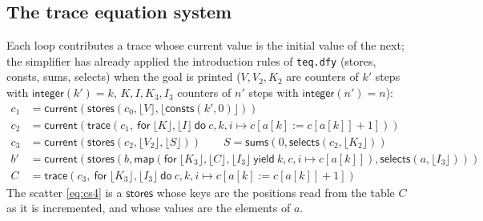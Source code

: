 \documentclass[11pt,a4paper]{article}
\newcommand{\bl}[1]{\lfloor #1\rfloor}                       %
\newcommand{\tr}[3]{\mathsf{trace}(#1,\ \mathsf{for}\ #2\ \mathsf{do}\ #3)}
\newcommand{\mapc}[2]{\mathsf{map}(\mathsf{for}\ #1\ \mathsf{yield}\ #2)}
\newcommand{\cur}{\mathsf{current}}
\newcommand{\intf}{\mathsf{integer}}
\newcommand{\sums}{\mathsf{sums}}
\begin{document}
\subsection{The trace equation system}
Each loop contributes a trace whose current value is the initial value of the next; the simplifier has
already applied the introduction rules of \texttt{teq.dfy} (stores, consts, sums, selects) when the goal
is printed ($V, V_2, K_2$ are counters of $k'$ steps with $\intf(k') = k$, $K, I, K_3, I_3$ counters of
$n'$ steps with $\intf(n') = n$):
\begin{align}
  c_1 &= \cur(\mathsf{stores}(c_0, \bl{V}, \bl{\mathsf{consts}(k', 0)})) \label{eq:cs1}\\
  c_2 &= \cur(\tr{c_1}{\bl{K}, \bl{I}}{c, k, i \mapsto c[a[k] := c[a[k]] + 1]}) \label{eq:cs2}\\
  c_3 &= \cur(\mathsf{stores}(c_2, \bl{V_2}, \bl{S})) \qquad S = \sums(0, \mathsf{selects}(c_2, \bl{K_2})) \label{eq:cs3}\\
  b' &= \cur(\mathsf{stores}(b, \mapc{\bl{K_3}, \bl{C}, \bl{I_3}}{k, c, i \mapsto c[a[k]]}, \mathsf{selects}(a, \bl{I_3}))) \label{eq:cs4}\\
  C &= \tr{c_3}{\bl{K_3}, \bl{I_3}}{c, k, i \mapsto c[a[k] := c[a[k]] + 1]} \label{eq:cs5}
\end{align}
The scatter \eqref{eq:cs4} is a $\mathsf{stores}$ whose keys are the positions read from the table $C$ as
it is incremented, and whose values are the elements of $a$.
\end{document}
